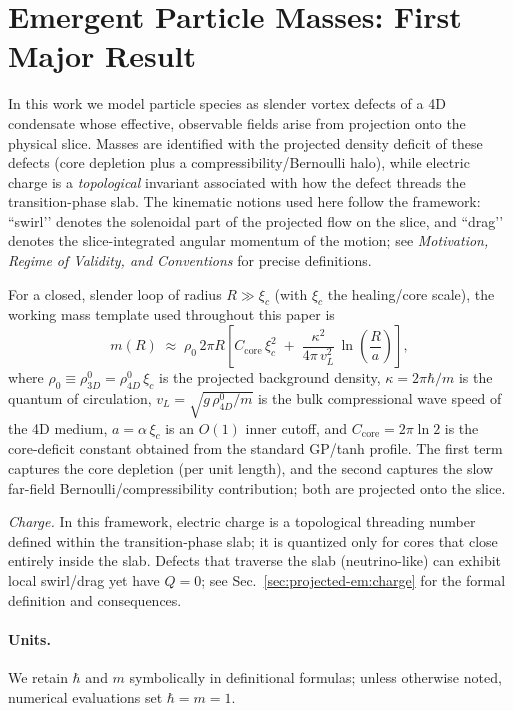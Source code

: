 \section{Emergent Particle Masses: First Major Result}\label{sec:emergent-particles}

In this work we model particle species as slender vortex defects of a 4D condensate whose effective, observable fields arise from projection onto the physical slice. Masses are identified with the projected density deficit of these defects (core depletion plus a compressibility/Bernoulli halo), while electric charge is a \emph{topological} invariant associated with how the defect threads the transition-phase slab. The kinematic notions used here follow the framework: “swirl’’ denotes the solenoidal part of the projected flow on the slice, and “drag’’ denotes the slice-integrated angular momentum of the motion; see \emph{Motivation, Regime of Validity, and Conventions} for precise definitions.

For a closed, slender loop of radius $R\gg\xi_c$ (with $\xi_c$ the healing/core scale), the working mass template used throughout this paper is
\begin{equation}
\label{eq:mass-template}
m(R)\;\approx\;\rho_0\,2\pi R\left[
C_{\mathrm{core}}\,\xi_c^2\;+\;\frac{\kappa^2}{4\pi\,v_L^2}\,
\ln\!\left(\frac{R}{a}\right)\right],
\end{equation}
where $\rho_0\equiv \rho_{3D}^0=\rho_{4D}^0\,\xi_c$ is the projected background density, $\kappa=2\pi\hbar/m$ is the quantum of circulation, $v_L=\sqrt{g\,\rho_{4D}^0/m}$ is the bulk compressional wave speed of the 4D medium, $a=\alpha\,\xi_c$ is an $O(1)$ inner cutoff, and $C_{\mathrm{core}}=2\pi\ln 2$ is the core-deficit constant obtained from the standard GP/tanh profile. The first term captures the core depletion (per unit length), and the second captures the slow far-field Bernoulli/compressibility contribution; both are projected onto the slice.

\emph{Charge.} In this framework, electric charge is a topological threading number defined within the transition-phase slab; it is quantized only for cores that close entirely inside the slab. Defects that traverse the slab (neutrino-like) can exhibit local swirl/drag yet have $Q=0$; see Sec.~\ref{sec:projected-em:charge} for the formal definition and consequences.

\paragraph{Units.}
We retain $\hbar$ and $m$ symbolically in definitional formulas; unless otherwise noted, numerical evaluations set $\hbar=m=1$.

